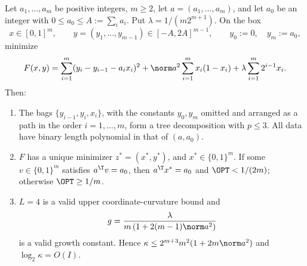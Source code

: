 \begin{proposition}\label{lim:prop:unique}
Let $a_1,\ldots,a_m$ be positive integers, $m\ge2$, let $a=(a_1,\ldots,a_m)$,
and let $a_0$ be an integer with $0\le a_0\le A:=\sum_ia_i$. Put
$\lambda=1/(m2^{m+1})$. On the box
\[
x\in[0,1]^m,\qquad y=(y_1,\ldots,y_{m-1})\in[-A,2A]^{m-1},
\qquad y_0:=0,\quad y_m:=a_0,
\]
minimize
\[
F(x,y)=\sum_{i=1}^m(y_i-y_{i-1}-a_ix_i)^2
+\norm a^2\sum_{i=1}^mx_i(1-x_i)+\lambda\sum_{i=1}^m2^{i-1}x_i .
\]
Then:
\begin{enumerate}
\item The bags $\{y_{i-1},y_i,x_i\}$, with the constants $y_0,y_m$ omitted
  and arranged as a path in the order $i=1,\ldots,m$, form a tree
  decomposition with $p\le3$. All data have binary length polynomial in
  that of $(a,a_0)$.
\item $F$ has a unique minimizer $z^*=(x^*,y^*)$, and $x^*\in\{0,1\}^m$.
  If some $v\in\{0,1\}^m$ satisfies $a^{\T}v=a_0$, then
  $a^{\T}x^*=a_0$ and $\OPT<1/(2m)$; otherwise $\OPT\ge1/m$.
\item $L=4$ is a valid upper coordinate-curvature bound and
  \[
  g=\frac{\lambda}{m\,(1+2(m-1)\norm a^2)}
  \]
  is a valid growth constant. Hence
  $\kappa\le2^{m+3}m^2(1+2m\norm a^2)$ and $\log_2\kappa=O(I)$.
\end{enumerate}
\end{proposition}

